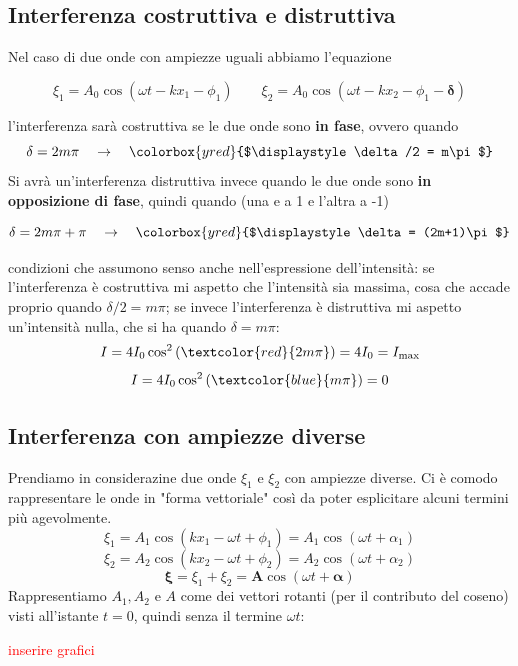 \documentclass[x11names]{report}
\newcommand{\viola}[1]{\colorbox{yred}{$\displaystyle #1$}}
\begin{document}
	\begin{es}{}
		\subsection{Interferenza costruttiva e distruttiva}
		Nel caso di due onde con ampiezze uguali abbiamo l'equazione 
		
		\[ 
		\xi_1 = A_0\cos\left(\omega t - kx_1 - \phi_1\right)
		\qquad
		\xi_2 = A_0\cos\left(\omega t - kx_2 - \phi_1 - \boldsymbol{\delta}\right)
		\] 
		
		l'interferenza sarà costruttiva se le due onde sono \textbf{in fase}, ovvero quando 
		\[ 
		\delta = 2m\pi \quad \to \quad \viola{\delta/2 = m\pi }
		\]
		Si avrà un'interferenza distruttiva invece quando le due onde sono \textbf{in opposizione di fase}, quindi quando (una e a 1 e l'altra a -1)
		
		\[ 
		\delta = 2m\pi + \pi \quad \to \quad \viola{\delta = (2m+1)\pi }
		\]
		
		condizioni che assumono senso anche nell'espressione dell'intensità: se l'interferenza è costruttiva mi aspetto che l'intensità sia massima, cosa che accade proprio quando  \(\delta/2 = m\pi \); se invece l'interferenza è distruttiva mi aspetto un'intensità nulla, che si ha quando \(\delta = m\pi \):
		\[ 
		I = 4I_0 \cos^2\left(\textcolor{red}{2m\pi }\right) = 4I_0 = I_\text{max}
		\]
		\[ 
		I = 4I_0 \cos^2\left(\textcolor{blue}{m\pi }\right) = 0 
		\]
	\end{es}
	
	\subsection{Interferenza con ampiezze diverse}
	Prendiamo in considerazine due onde \(\xi_1\) e \(\xi_2\) con ampiezze diverse. Ci è comodo rappresentare le onde in "forma vettoriale" così da poter esplicitare alcuni termini più agevolmente.
	\[ 
	\xi_1 = A_1 \cos\left(kx_1 - \omega t + \phi_1\right) = A_1 \cos\left(\omega t + \alpha_1\right)
	\]
	\[ 
	\xi_2 = A_2 \cos\left(kx_2 - \omega t + \phi_2\right) = A_2 \cos\left(\omega t + \alpha_2\right)
	\]
	\[ 
	\boldsymbol{\xi} = \xi _1 + \xi _2 = \boldsymbol{A}\cos\left(\omega t + \boldsymbol{\alpha}\right)
	\]
	Rappresentiamo \(A_1,A_2\) e \(A\) come dei vettori rotanti (per il contributo del coseno) visti all'istante \(t=0\), quindi senza il termine \(\omega t\):
	
	\begin{center}
		\textcolor{red}{inserire grafici}
	\end{center}
	
\end{document}
